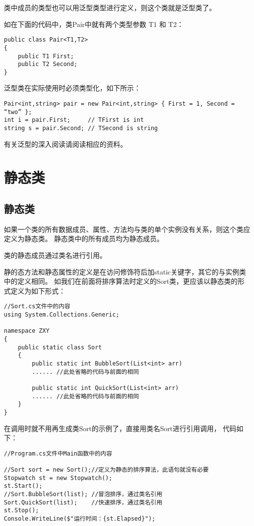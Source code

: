 类中成员的类型也可以用泛型类型进行定义，则这个类就是泛型类了。

如在下面的代码中，类Pair中就有两个类型参数 T1 和 T2：

\begin{lstlisting}
public class Pair<T1,T2>
{
    public T1 First;
    public T2 Second;
}
\end{lstlisting}

泛型类在实际使用时必须类型化，如下所示：

\begin{lstlisting}
Pair<int,string> pair = new Pair<int,string> { First = 1, Second = “two” };
int i = pair.First;     // TFirst is int
string s = pair.Second; // TSecond is string
\end{lstlisting}

有关泛型的深入阅读请阅读相应的资料。


\section{静态类}

\subsection{静态类}

如果一个类的所有数据成员、属性、方法均与类的单个实例没有关系，则这个类应定义为静态类。
静态类中的所有成员均为静态成员。

类的静态成员通过类名进行引用。

静的态方法和静态属性的定义是在访问修饰符后加static关键字，其它的与实例类中的定义相同。
如我们在前面将排序算法时定义的Sort类，更应该以静态类的形式定义为如下形式：
\begin{lstlisting}
//Sort.cs文件中的内容
using System.Collections.Generic;

namespace ZXY
{
    public static class Sort
    {
        public static int BubbleSort(List<int> arr)
        ...... //此处省略的代码与前面的相同

        public static int QuickSort(List<int> arr)
        ...... //此处省略的代码与前面的相同
    }
}
\end{lstlisting}

在调用时就不用再生成类Sort的示例了，直接用类名Sort进行引用调用，
代码如下：

\begin{lstlisting}
//Program.cs文件中Main函数中的内容

//Sort sort = new Sort();//定义为静态的排序算法，此语句就没有必要
Stopwatch st = new Stopwatch();
st.Start();
//Sort.BubbleSort(list); //冒泡排序，通过类名引用
Sort.QuickSort(list);    //快速排序，通过类名引用
st.Stop();
Console.WriteLine($"运行时间：{st.Elapsed}");
\end{lstlisting}



